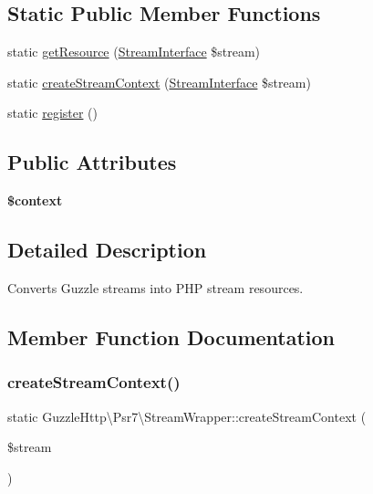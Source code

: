 \subsection*{Static Public Member Functions}
\begin{DoxyCompactItemize}
\item 
static \hyperlink{classGuzzleHttp_1_1Psr7_1_1StreamWrapper_a77ac3c99c5c69e2cc44228a0617d7f15}{get\+Resource} (\hyperlink{interfacePsr_1_1Http_1_1Message_1_1StreamInterface}{Stream\+Interface} \$stream)
\item 
static \hyperlink{classGuzzleHttp_1_1Psr7_1_1StreamWrapper_ac4856c354b30f836f76345ab3603aa93}{create\+Stream\+Context} (\hyperlink{interfacePsr_1_1Http_1_1Message_1_1StreamInterface}{Stream\+Interface} \$stream)
\item 
static \hyperlink{classGuzzleHttp_1_1Psr7_1_1StreamWrapper_accf0598d5831bffb4e193b2ed21be95d}{register} ()
\end{DoxyCompactItemize}
\subsection*{Public Attributes}
\begin{DoxyCompactItemize}
\item 
\mbox{\label{classGuzzleHttp_1_1Psr7_1_1StreamWrapper_ac2fe77a233f520a08230862ae48fdf7a}} 
{\bfseries \$context}
\end{DoxyCompactItemize}


\subsection{Detailed Description}
Converts Guzzle streams into P\+HP stream resources. 

\subsection{Member Function Documentation}
\mbox{\label{classGuzzleHttp_1_1Psr7_1_1StreamWrapper_ac4856c354b30f836f76345ab3603aa93}} 
\subsubsection{\texorpdfstring{create\+Stream\+Context()}{createStreamContext()}}
{\footnotesize\ttfamily static Guzzle\+Http\textbackslash{}\+Psr7\textbackslash{}\+Stream\+Wrapper\+::create\+Stream\+Context (\begin{DoxyParamCaption}\item[{\hyperlink{interfacePsr_1_1Http_1_1Message_1_1StreamInterface}{Stream\+Interface}}]{\$stream }\end{DoxyParamCaption})\hspace{0.3cm}{\ttfamily [static]}}

